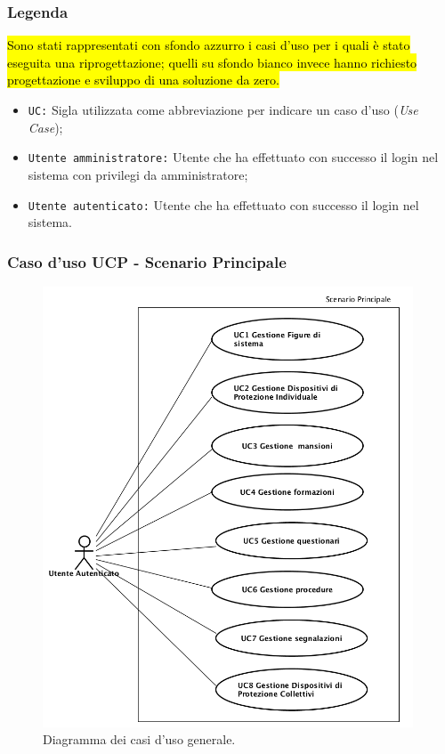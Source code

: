 	\subsubsection{Legenda}
	\hl{Sono stati rappresentati con sfondo azzurro i casi d'uso per i quali è stato eseguita una riprogettazione; quelli su sfondo bianco  invece hanno richiesto progettazione e sviluppo di una soluzione da zero.}
	\begin{itemize}
		\item \texttt{UC:} Sigla utilizzata come abbreviazione per indicare un caso d'uso (\textit{Use Case});
		\item \texttt{Utente amministratore:} Utente che ha effettuato con successo il login nel sistema con privilegi da amministratore;
		\item \texttt{Utente autenticato:} Utente che ha effettuato con successo il login nel sistema.
	\end{itemize}
	
	\subsubsection{Caso d'uso UCP - Scenario Principale }
	\begin{figure}[H]
		\begin{center}
			\includegraphics[width=11cm]{Pics/Diagramma_generale_dei_casi_d_uso.png}
			\caption{
				Diagramma dei casi d'uso generale.}
			\label{fig:DiagrammaGeneraleCasiDuso}
		\end{center}
	\end{figure}	
	
